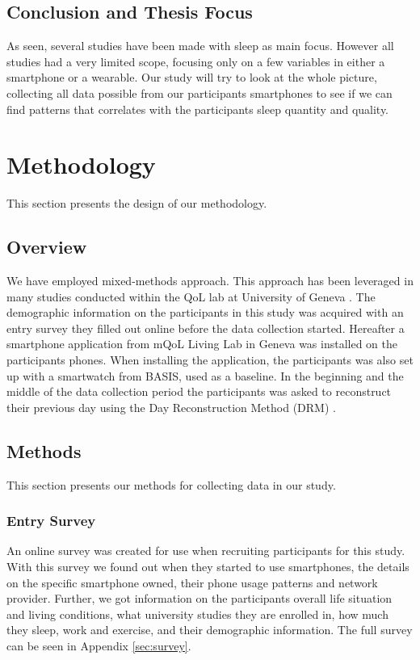 \documentclass[12pt]{article} %
\begin{document}
\subsection{Conclusion and Thesis Focus}
As seen, several studies have been made with sleep as main focus. However all studies had a very limited scope, focusing only on a few variables in either a smartphone or a wearable. Our study will try to look at the whole picture, collecting all data possible from our participants smartphones to see if we can find patterns that correlates with the participants sleep quantity and quality.   

\newpage
\section{Methodology}
This section presents the design of our methodology.

\subsection{Overview}
We have employed mixed-methods approach. This approach has been leveraged in many studies conducted within the QoL lab at University of Geneva \cite{seoul}. The demographic information on the participants in this study was acquired with an entry survey they filled out online before the data collection started. Hereafter a smartphone application from mQoL Living Lab in Geneva \cite{mQOL} was installed on the participants phones. When installing the application, the participants was also set up with a smartwatch from BASIS, used as a baseline. In the beginning and the middle of the data collection period the participants was asked to reconstruct their previous day using the Day Reconstruction Method (DRM) \cite{drm}. 

\subsection{Methods}
This section presents our methods for collecting data in our study. 

\subsubsection{Entry Survey}
An online survey was created for use when recruiting participants for this study. With this survey we found out when they started to use smartphones, the details on the specific smartphone owned, their phone usage patterns and network provider. Further, we got information on the participants overall life situation and living conditions, what university studies they are enrolled in, how much they sleep, work and exercise, and their demographic information. The full survey can be seen in Appendix \ref{sec:survey}. 
\end{document}
